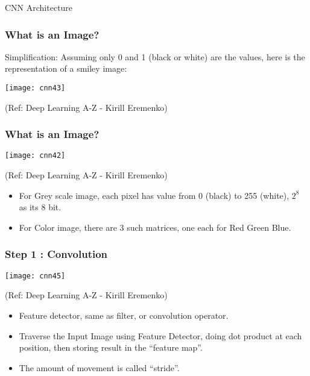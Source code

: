 \begin{frame}
  \begin{center}
    {\Large CNN Architecture}
  \end{center}
\end{frame}

\begin{frame}[fragile] \frametitle{What is an Image?}
Simplification: Assuming only 0 and 1 (black or white) are the values, here is the representation of a smiley image:

\begin{center}
\texttt{[image: cnn43]}

\tiny{(Ref: Deep Learning A-Z - Kirill Eremenko)}
\end{center}



\end{frame}



\begin{frame}[fragile] \frametitle{What is an Image?}

\begin{center}
\texttt{[image: cnn42]}

\tiny{(Ref: Deep Learning A-Z - Kirill Eremenko)}
\end{center}

\begin{itemize}
\item For Grey scale image, each pixel has value from 0 (black) to 255 (white), $2^8$ as its 8 bit.
\item For Color image, there are 3 such matrices, one each for Red Green Blue.
\end{itemize}


\end{frame}

\begin{frame}[fragile] \frametitle{Step 1 : Convolution}

\begin{center}
\texttt{[image: cnn45]}

\tiny{(Ref: Deep Learning A-Z - Kirill Eremenko)}
\end{center}

\begin{itemize}
\item Feature detector, same as filter, or convolution operator.
\item Traverse the Input Image using Feature Detector, doing dot product at each position, then storing result in the ``feature map''.
\item The amount of movement is called ``stride''.
\end{itemize}
\end{frame}

